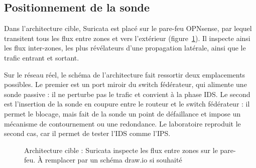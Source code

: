 \subsection{Positionnement de la sonde}

Dans l'architecture cible, Suricata est placé sur le pare-feu OPNsense, par lequel transitent tous les flux entre zones et vers l'extérieur (figure~\ref{fig:cible}). Il inspecte ainsi les flux inter-zones, les plus révélateurs d'une propagation latérale, ainsi que le trafic entrant et sortant.

Sur le réseau réel, le schéma de l'architecture fait ressortir deux emplacements possibles. Le premier est un port miroir du switch fédérateur, qui alimente une sonde passive : il ne perturbe pas le trafic et convient à la phase IDS. Le second est l'insertion de la sonde en coupure entre le routeur et le switch fédérateur : il permet le blocage, mais fait de la sonde un point de défaillance et impose un mécanisme de contournement ou une redondance. Le laboratoire reproduit le second cas, car il permet de tester l'IDS comme l'IPS.

\begin{figure}[htbp]
\centering
\small
{}
\caption{Architecture cible : Suricata inspecte les flux entre zones sur le pare-feu. À remplacer par un schéma draw.io si souhaité}
\label{fig:cible}
\end{figure}

